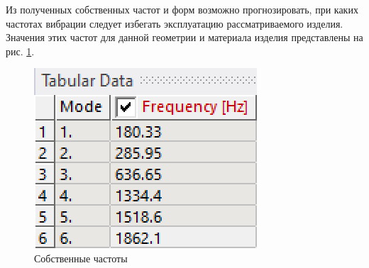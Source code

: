 Из полученных собственных частот и форм возможно прогнозировать, при каких частотах вибрации следует избегать эксплуатацию рассматриваемого изделия. Значения этих частот для данной геометрии и материала изделия представлены на рис. \ref{fig:frequency_tabular}.

\begin{figure}[H] 
	\center
	\includegraphics[width=.33\textwidth]{images/frequency_tabular.png}
	\caption{Собственные частоты}
	\label{fig:frequency_tabular}
\end{figure}

